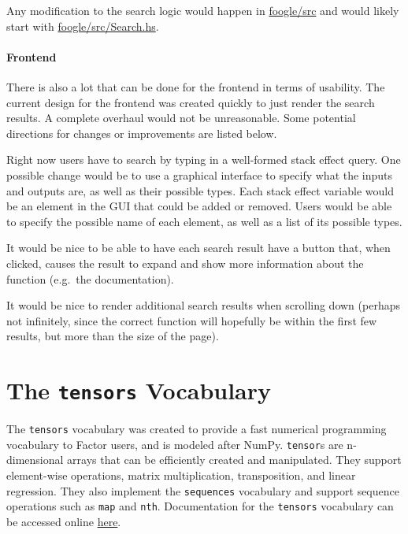 \documentclass[
]{article}
\begin{document}
Any modification to the search logic would happen in
\href{https://github.com/factor-hmc/foogle/tree/master/src}{foogle/src}
and would likely start with
\href{https://github.com/factor-hmc/foogle/blob/master/src/Search.hs}{foogle/src/Search.hs}.

\hypertarget{frontend-1}{%
\paragraph{Frontend}\label{frontend-1}}

There is also a lot that can be done for the frontend in terms of
usability. The current design for the frontend was created quickly to
just render the search results. A complete overhaul would not be
unreasonable. Some potential directions for changes or improvements are
listed below.

Right now users have to search by typing in a well-formed stack effect
query. One possible change would be to use a graphical interface to
specify what the inputs and outputs are, as well as their possible
types. Each stack effect variable would be an element in the GUI that
could be added or removed. Users would be able to specify the possible
name of each element, as well as a list of its possible types.

It would be nice to be able to have each search result have a button
that, when clicked, causes the result to expand and show more
information about the function (e.g.~the documentation).

It would be nice to render additional search results when scrolling down
(perhaps not infinitely, since the correct function will hopefully be
within the first few results, but more than the size of the page).

\hypertarget{the-tensors-vocabulary}{%
\section{\texorpdfstring{The \texttt{tensors}
Vocabulary}{The tensors Vocabulary}}\label{the-tensors-vocabulary}}

The \texttt{tensors} vocabulary was created to provide a fast numerical
programming vocabulary to Factor users, and is modeled after NumPy.
\texttt{tensor}s are n-dimensional arrays that can be efficiently
created and manipulated. They support element-wise operations, matrix
multiplication, transposition, and linear regression. They also
implement the \texttt{sequences} vocabulary and support sequence
operations such as \texttt{map} and \texttt{nth}. Documentation for the
\texttt{tensors} vocabulary can be accessed online
\href{https://docs.factorcode.org/content/article-tensors.html}{here}.
\end{document}
